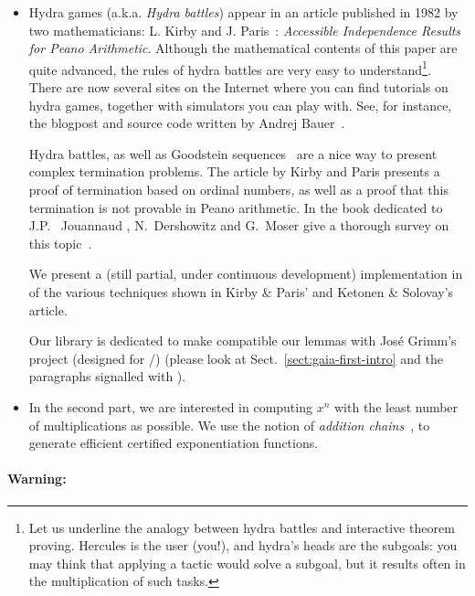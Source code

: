 \documentclass[twoside,a4paper]{book}
\newcommand{\gaiasign}{\texorpdfstring{\mycircled[orange!40]{{\mbox{\color{blue!65}{\scriptsize{G}}}}}}{Gaia-Hydra}}
\begin{document}
\begin{itemize}
\item Hydra games (a.k.a. \emph{Hydra battles}) appear in an article published in 1982 by two mathematicians:
L. Kirby and J. Paris~\cite{KP82}: \emph{Accessible Independence Results for Peano Arithmetic}. 
Although the mathematical contents of this 
paper are quite advanced, the rules of hydra battles are very easy to understand\footnote{Let us underline the analogy between hydra battles and interactive theorem proving. Hercules is the user (you!), and hydra's heads are the subgoals: you may think that applying a tactic would solve a subgoal, but it results often in the multiplication of such tasks.}.
There are now several sites on the Internet where you can find tutorials on hydra games, together with simulators you can play with. See, for instance, the blogpost and source code written by Andrej Bauer~\cite{bauer2008,BauerHydra}.




Hydra battles, as well as Goodstein sequences~\cite{goodstein_1944, KP82}
are a nice way to present complex termination problems.
The article by Kirby and Paris presents a proof of termination
based on ordinal numbers, as well as a proof that this termination is not
provable in Peano arithmetic. In the book dedicated to 
J.P. ~Jouannaud \cite{HommageJPJ}, N.~Dershowitz and G.~Moser  give a thorough survey on this topic~\cite{Dershowitz2007}.

We present a (still partial, under continuous development) implementation in \coq of the various techniques shown in
Kirby \& Paris' and Ketonen \& Solovay's~\cite{KS81} article.

Our library \gaiaHydras is dedicated to make compatible our lemmas with José Grimm's \gaia project (designed for \ssreflect/\mathcomp) (please look at Sect.~\vref{sect:gaia-first-intro} and the paragraphs signalled with {\gaiasign}).


\item In the second part, we are interested in computing $x^n$ with the least number of multiplications as possible. We use the notion of \emph{addition chains}~\cite{brauer1939,DBLP:journals/ipl/BerstelB87}, to generate efficient certified exponentiation functions.
\end{itemize}

\paragraph*{Warning:}
\end{document}
